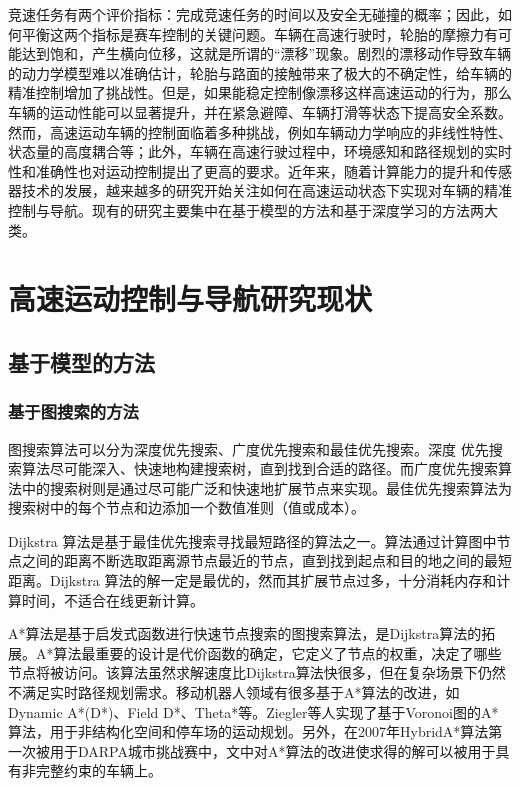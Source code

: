 竞速任务有两个评价指标：完成竞速任务的时间以及安全无碰撞的概率；因此，如何平衡这两个指标是赛车控制的关键问题\cite{liniger2015optimization}。车辆在高速行驶时，轮胎的摩擦力有可能达到饱和，产生横向位移，这就是所谓的“漂移”现象\cite{hindiyeh2013dynamics}。剧烈的漂移动作导致车辆的动力学模型难以准确估计，轮胎与路面的接触带来了极大的不确定性，给车辆的精准控制增加了挑战性\cite{goh2024beyond}。但是，如果能稳定控制像漂移这样高速运动的行为，那么车辆的运动性能可以显著提升，并在紧急避障、车辆打滑等状态下提高安全系数。然而，高速运动车辆的控制面临着多种挑战，例如车辆动力学响应的非线性特性、状态量的高度耦合等\cite{rajamani2006vehicle}；此外，车辆在高速行驶过程中，环境感知和路径规划的实时性和准确性也对运动控制提出了更高的要求\cite{kabzan2020amz, heilmeier2020minimum, drews2019vision}。近年来，随着计算能力的提升和传感器技术的发展，越来越多的研究开始关注如何在高速运动状态下实现对车辆的精准控制与导航。现有的研究主要集中在基于模型的方法和基于深度学习的方法两大类。

\section{高速运动控制与导航研究现状}
\subsection{基于模型的方法}
\subsubsection{基于图搜索的方法}
图搜索算法可以分为深度优先搜索、广度优先搜索和最佳优先搜索。深度 优先搜索算法尽可能深入、快速地构建搜索树，直到找到合适的路径。而广度优先搜索算法中的搜索树则是通过尽可能广泛和快速地扩展节点来实现。最佳优先搜索算法为搜索树中的每个节点和边添加一个数值准则（值或成本）。

Dijkstra 算法\cite{dijkstra2022note}是基于最佳优先搜索寻找最短路径的算法之一。算法通过计算图中节点之间的距离不断选取距离源节点最近的节点，直到找到起点和目的地之间的最短距离。Dijkstra 算法的解一定是最优的，然而其扩展节点过多，十分消耗内存和计算时间，不适合在线更新计算。

A*算法\cite{hart1968formal}是基于启发式函数进行快速节点搜索的图搜索算法，是Dijkstra算法的拓展。A*算法最重要的设计是代价函数的确定，它定义了节点的权重，决定了哪些节点将被访问。该算法虽然求解速度比Dijkstra算法快很多，但在复杂场景下仍然不满足实时路径规划需求。移动机器人领域有很多基于A*算法的改进，如Dynamic A*(D*)、Field D*、Theta*等。Ziegler等人实现了基于Voronoi图的A*算法，用于非结构化空间和停车场的运动规划\cite{ziegler2008navigating}。另外，在2007年HybridA*算法第一次被用于DARPA城市挑战赛中\cite{dolgov2008practical}，文中对A*算法的改进使求得的解可以被用于具有非完整约束的车辆上。

